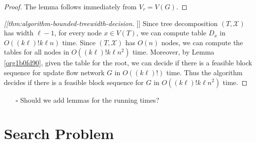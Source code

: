 \documentclass[fontsize=11pt,paper=a4]{book}
\begin{document}
\begin{proof}
The lemma follows immediately from \(V_r=V(G)\).
\end{proof}

\begin{proof}[[[thm:algorithm-bounded-treewidth-decision]]]
Since tree decomposition \((T,\mathcal{X})\) has width \(\ell-1\), for every node \(x\in V(T)\), we can compute table \(D_x\) in \(O((k\ell)!k\ell n)\) time.
Since \((T,\mathcal{X})\) has \(O(n)\) nodes, we can compute the tables for all nodes in \(O((k\ell)!k\ell n^2)\) time.
Moreover, by Lemma \ref{org1b0fd90}, given the table for the root, we can decide if there is a feasible block sequence for update flow network \(G\) in \(O((k\ell)!)\) time.
Thus the algorithm decides if there is a feasible block sequence for \(G\) in \(O((k\ell)!k\ell n^2)\) time.
\end{proof}

\begin{itemize}
\item[{$\square$}] Should we add lemmas for the running times?
\end{itemize}

\chapter{Search Problem}
\label{sec:orgfa1c62a}
\end{document}
